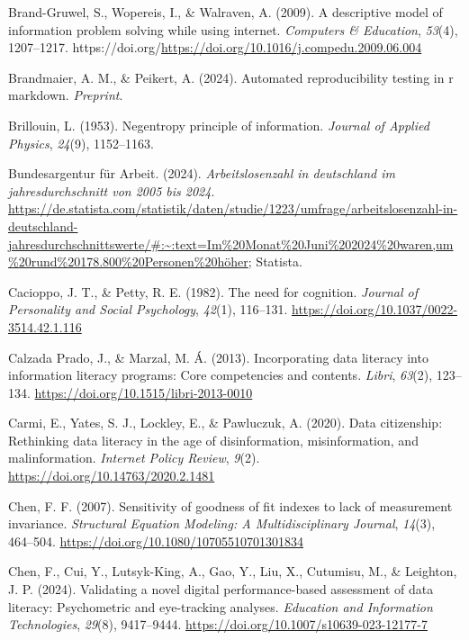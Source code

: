 \documentclass[
  12pt,
  a4paper,
  twoside]{article}
\newlength{\cslhangindent}
\newenvironment{CSLReferences}[2] %
 {\begin{list}{}{%
  \setlength{\itemindent}{0pt}
  \setlength{\leftmargin}{0pt}
  \setlength{\parsep}{0pt}
  \ifodd #1
   \setlength{\leftmargin}{\cslhangindent}
   \setlength{\itemindent}{-1\cslhangindent}
  \fi
  \setlength{\itemsep}{#2\baselineskip}}}
 {\end{list}}
\begin{document}
\begin{CSLReferences}{1}{0}
Brand-Gruwel, S., Wopereis, I., \& Walraven, A. (2009). A descriptive model of information problem solving while using internet. \emph{Computers \& Education}, \emph{53}(4), 1207--1217. https://doi.org/\url{https://doi.org/10.1016/j.compedu.2009.06.004}

Brandmaier, A. M., \& Peikert, A. (2024). Automated reproducibility testing in r markdown. \emph{Preprint}.

Brillouin, L. (1953). Negentropy principle of information. \emph{Journal of Applied Physics}, \emph{24}(9), 1152--1163.

Bundesargentur für Arbeit. (2024). \emph{Arbeitslosenzahl in deutschland im jahresdurchschnitt von 2005 bis 2024}. \url{https://de.statista.com/statistik/daten/studie/1223/umfrage/arbeitslosenzahl-in-deutschland-jahresdurchschnittswerte/\#:~:text=Im\%20Monat\%20Juni\%202024\%20waren,um\%20rund\%20178.800\%20Personen\%20höher}; Statista.

Cacioppo, J. T., \& Petty, R. E. (1982). The need for cognition. \emph{Journal of Personality and Social Psychology}, \emph{42}(1), 116--131. \url{https://doi.org/10.1037/0022-3514.42.1.116}

Calzada Prado, J., \& Marzal, M. Á. (2013). Incorporating data literacy into information literacy programs: Core competencies and contents. \emph{Libri}, \emph{63}(2), 123--134. \url{https://doi.org/10.1515/libri-2013-0010}

Carmi, E., Yates, S. J., Lockley, E., \& Pawluczuk, A. (2020). Data citizenship: Rethinking data literacy in the age of disinformation, misinformation, and malinformation. \emph{Internet Policy Review}, \emph{9}(2). \url{https://doi.org/10.14763/2020.2.1481}

Chen, F. F. (2007). Sensitivity of goodness of fit indexes to lack of measurement invariance. \emph{Structural Equation Modeling: A Multidisciplinary Journal}, \emph{14}(3), 464--504. \url{https://doi.org/10.1080/10705510701301834}

Chen, F., Cui, Y., Lutsyk-King, A., Gao, Y., Liu, X., Cutumisu, M., \& Leighton, J. P. (2024). Validating a novel digital performance-based assessment of data literacy: Psychometric and eye-tracking analyses. \emph{Education and Information Technologies}, \emph{29}(8), 9417--9444. \url{https://doi.org/10.1007/s10639-023-12177-7}


\end{CSLReferences}
\end{document}
